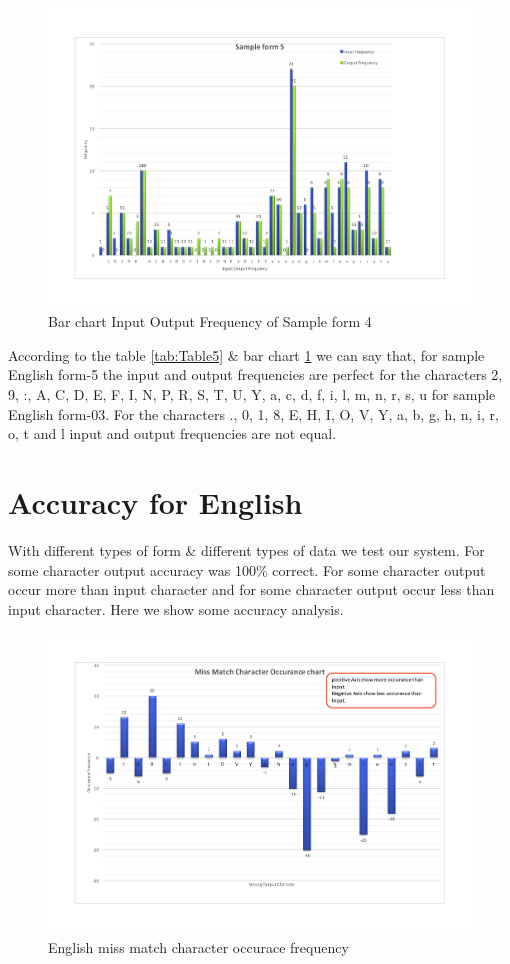 \begin{figure}[H]
\centering
\includegraphics[width=1\textwidth]{form5.pdf}
\caption {Bar chart Input Output Frequency of Sample form 4}
\label {fig:bar5}
\end{figure}
According to the table \ref{tab:Table5} \& bar chart \ref{fig:bar5} we can say that, for sample English form-5 the input and output frequencies are perfect for the characters 2, 9, :, A, C, D, E, F, I, N, P, R, S, T, U, Y, a, c, d, f, i, l, m, n, r, s, u for sample English form-03. For the characters ., 0, 1, 8, E, H, I, O, V, Y, a, b, g, h, n, i, r, o, t and l input and output frequencies are not equal. 
\section{Accuracy for English}
With different types of form \& different types of data we test our system. For some character output accuracy was 100\% correct. For some character output occur more than input character and for some character output occur less than input character. Here we show some accuracy analysis.

\begin{figure}[H]
\centering
\includegraphics[width=1\textwidth]{EOccurance.pdf}
\caption {English miss match character occurace frequency}
\label {fig:Accuracy}
\end{figure}

